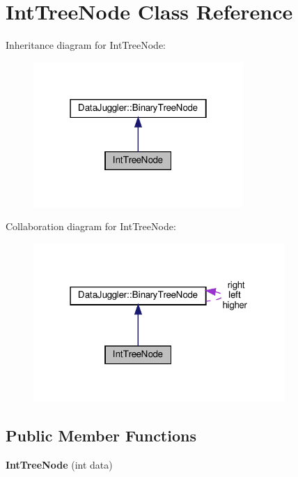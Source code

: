 \hypertarget{classIntTreeNode}{}\section{Int\+Tree\+Node Class Reference}
\label{classIntTreeNode}


Inheritance diagram for Int\+Tree\+Node\+:
\nopagebreak
\begin{figure}[H]
\begin{center}
\leavevmode
\includegraphics[width=226pt]{classIntTreeNode__inherit__graph}
\end{center}
\end{figure}


Collaboration diagram for Int\+Tree\+Node\+:
\nopagebreak
\begin{figure}[H]
\begin{center}
\leavevmode
\includegraphics[width=271pt]{classIntTreeNode__coll__graph}
\end{center}
\end{figure}
\subsection*{Public Member Functions}
\begin{DoxyCompactItemize}
\item 
\mbox{\label{classIntTreeNode_ac174519d357f90b67ca62cdea6d6077e}} 
{\bfseries Int\+Tree\+Node} (int data)
\end{DoxyCompactItemize}
